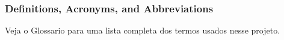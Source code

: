 \subsubsection*{Definitions, Acronyms, and Abbreviations}

Veja o Glossario para uma lista completa dos termos  usados nesse projeto. 







 	
